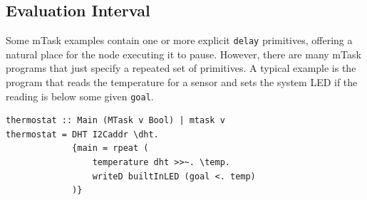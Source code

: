 \documentclass[runningheads]{llncs}
\newcommand{\CleanInline}[1]{\lstinline[language=Clean]!#1!}
\newcommand{\prog}[1]{\CleanInline{#1}}
\begin{document}



\subsection{Evaluation Interval}

Some mTask examples contain one or more explicit \prog{delay} primitives, offering a natural place for the node executing it to pause.
However, there are many mTask programs that just specify a repeated set of primitives.
A typical example is the program that reads the temperature for a sensor and sets the system LED if the reading is below some given \prog{goal}.

\begin{lstlisting}[language=Clean,caption={A basic thermostat task.},label={lst:thermostat}]
thermostat :: Main (MTask v Bool) | mtask v
thermostat = DHT I2Caddr \dht.
             {main = rpeat (
                 temperature dht >>~. \temp.
                 writeD builtInLED (goal <. temp)
             )}
\end{lstlisting}
\end{document}
